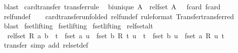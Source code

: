 \begin{isabellebody}
\ blast%
\endisatagproof
{\isafoldproof}%
%
\isadelimproof
\isanewline
%
\endisadelimproof
\isanewline
{}\isamarkupfalse%
\ card{\isacharunderscore}transfer\ {\isacharbrackleft}transfer{\isacharunderscore}rule{\isacharbrackright}{\isacharcolon}\isanewline
\ \ {\isachardoublequoteopen}bi{\isacharunderscore}unique\ A\ {\isasymLongrightarrow}\ {\isacharparenleft}rel{\isacharunderscore}fset\ A\ {\isacharequal}{\isacharequal}{\isacharequal}{\isachargreater}\ {\isacharparenleft}{\isacharequal}{\isacharparenright}{\isacharparenright}\ fcard\ fcard{\isachardoublequoteclose}\isanewline
%
\isadelimproof
\ \ %
\endisadelimproof
%
\isatagproof
{}\isamarkupfalse%
\ rel{\isacharunderscore}fun{\isacharunderscore}def\isanewline
\ \ \isamarkupfalse%
\ card{\isacharunderscore}transfer{\isacharbrackleft}unfolded\ rel{\isacharunderscore}fun{\isacharunderscore}def{\isacharcomma}\ rule{\isacharunderscore}format{\isacharcomma}\ Transfer{\isachardot}transferred{\isacharbrackright}\ \isamarkupfalse%
\ blast%
\endisatagproof
{\isafoldproof}%
%
\isadelimproof
\isanewline
%
\endisadelimproof
\isanewline
{}\isamarkupfalse%
\isanewline
\isanewline
{}\isamarkupfalse%
\ fset{\isachardot}lifting\isanewline
{}\isamarkupfalse%
\ fset{\isachardot}lifting%
\isadelimdocument
%
\endisadelimdocument
%
\isatagdocument
%
\isamarkuptrue%
%
\endisatagdocument
{\isafolddocument}%
%
\isadelimdocument
%
\endisadelimdocument
{}\isamarkupfalse%
\isanewline
{}\ fset{\isachardot}lifting\isanewline
{}\isanewline
\isanewline
{}\isamarkupfalse%
\ rel{\isacharunderscore}fset{\isacharunderscore}alt{\isacharcolon}\isanewline
\ \ {\isachardoublequoteopen}rel{\isacharunderscore}fset\ R\ a\ b\ {\isasymlongleftrightarrow}\ {\isacharparenleft}{\isasymforall}t\ {\isasymin}\ fset\ a{\isachardot}\ {\isasymexists}u\ {\isasymin}\ fset\ b{\isachardot}\ R\ t\ u{\isacharparenright}\ {\isasymand}\ {\isacharparenleft}{\isasymforall}t\ {\isasymin}\ fset\ b{\isachardot}\ {\isasymexists}u\ {\isasymin}\ fset\ a{\isachardot}\ R\ u\ t{\isacharparenright}{\isachardoublequoteclose}\isanewline
%
\isadelimproof
%
\endisadelimproof
%
\isatagproof
{}\isamarkupfalse%
\ transfer\ {\isacharparenleft}simp\ add{\isacharcolon}\ rel{\isacharunderscore}set{\isacharunderscore}def{\isacharparenright}%
\endisatagproof
{\isafoldproof}%
%
\isadelimproof
\isanewline
%

\end{isabellebody}

